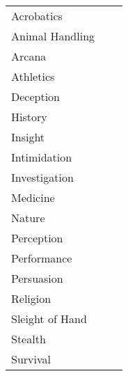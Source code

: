 \begin{tabular}{l|r|r}
  Acrobatics      & \modifierAcrobatics{}     & \skillmarkerAcrobatics{} \\
  Animal Handling & \modifierAnimalHandling{} & \skillmarkerAnimalHandling{} \\
  Arcana          & \modifierArcana{}         & \skillmarkerArcana{} \\
  Athletics       & \modifierAthletics{}      & \skillmarkerAthletics{} \\
  Deception       & \modifierDeception{}      & \skillmarkerDeception{} \\
  History         & \modifierHistory{}        & \skillmarkerHistory{} \\
  Insight         & \modifierInsight{}        & \skillmarkerInsight{} \\
  Intimidation    & \modifierIntimidation{}   & \skillmarkerIntimidation{} \\
  Investigation   & \modifierInvestigation{}  & \skillmarkerInvestigation{} \\
  Medicine        & \modifierMedicine{}       & \skillmarkerMedicine{} \\
  Nature          & \modifierNature{}         & \skillmarkerNature{} \\
  Perception      & \modifierPerception{}     & \skillmarkerPerception{} \\
  Performance     & \modifierPerformance{}    & \skillmarkerPerformance{} \\
  Persuasion      & \modifierPersuasion{}     & \skillmarkerPersuasion{} \\
  Religion        & \modifierReligion{}       & \skillmarkerReligion{} \\
  Sleight of Hand & \modifierSleightofHand{}  & \skillmarkerSleightofHand{} \\
  Stealth         & \modifierStealth{}        & \skillmarkerStealth{} \\
  Survival        & \modifierSurvival{}       & \skillmarkerSurvival{} \\
\end{tabular}
